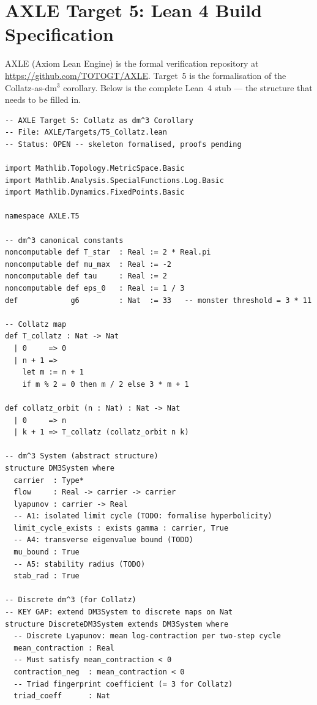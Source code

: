 \documentclass[11pt, a4paper]{article}
\theoremstyle{definition}
\begin{document}
\section{AXLE Target 5: Lean 4 Build Specification}
\label{sec:axle}

AXLE (Axiom Lean Engine) is the formal verification repository at
\url{https://github.com/TOTOGT/AXLE}.
Target~5 is the formalisation of the Collatz-as-dm$^3$ corollary.
Below is the complete Lean~4 stub --- the structure that needs to be filled in.

\begin{lstlisting}[language=Lean4, caption={AXLE Target 5 --- Lean 4 skeleton (AXLE/Targets/T5\_Collatz.lean)}, label={lst:lean}]
-- AXLE Target 5: Collatz as dm^3 Corollary
-- File: AXLE/Targets/T5_Collatz.lean
-- Status: OPEN -- skeleton formalised, proofs pending

import Mathlib.Topology.MetricSpace.Basic
import Mathlib.Analysis.SpecialFunctions.Log.Basic
import Mathlib.Dynamics.FixedPoints.Basic

namespace AXLE.T5

-- dm^3 canonical constants
noncomputable def T_star  : Real := 2 * Real.pi
noncomputable def mu_max  : Real := -2
noncomputable def tau     : Real := 2
noncomputable def eps_0   : Real := 1 / 3
def            g6         : Nat  := 33   -- monster threshold = 3 * 11

-- Collatz map
def T_collatz : Nat -> Nat
  | 0     => 0
  | n + 1 =>
    let m := n + 1
    if m % 2 = 0 then m / 2 else 3 * m + 1

def collatz_orbit (n : Nat) : Nat -> Nat
  | 0     => n
  | k + 1 => T_collatz (collatz_orbit n k)

-- dm^3 System (abstract structure)
structure DM3System where
  carrier  : Type*
  flow     : Real -> carrier -> carrier
  lyapunov : carrier -> Real
  -- A1: isolated limit cycle (TODO: formalise hyperbolicity)
  limit_cycle_exists : exists gamma : carrier, True
  -- A4: transverse eigenvalue bound (TODO)
  mu_bound : True
  -- A5: stability radius (TODO)
  stab_rad : True

-- Discrete dm^3 (for Collatz)
-- KEY GAP: extend DM3System to discrete maps on Nat
structure DiscreteDM3System extends DM3System where
  -- Discrete Lyapunov: mean log-contraction per two-step cycle
  mean_contraction : Real
  -- Must satisfy mean_contraction < 0
  contraction_neg  : mean_contraction < 0
  -- Triad fingerprint coefficient (= 3 for Collatz)
  triad_coeff      : Nat


\end{lstlisting}
\end{document}
